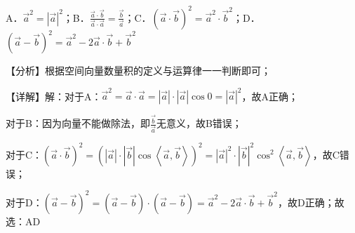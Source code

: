 



\bindopt A．\({\overrightarrow{a}}^{2} = \allowbreak\left| \overrightarrow{a} \right|^{2}\)；B．\(\frac{\overrightarrow{a} \cdot \overrightarrow{b}}{\overrightarrow{a} \cdot \overrightarrow{a}} = \frac{\overrightarrow{b}}{\overrightarrow{a}}\)；C．\(\left( \overrightarrow{a} \cdot \overrightarrow{b} \right)^{2} = {\overrightarrow{a}}^{2} \cdot {\overrightarrow{b}}^{2}\)；D．\(\left( \overrightarrow{a} - \overrightarrow{b} \right)^{2} = {\overrightarrow{a}}^{2} - 2\overrightarrow{a} \cdot \overrightarrow{b} + {\overrightarrow{b}}^{2}\)

\bindp 【分析】根据空间向量数量积的定义与运算律一一判断即可；

\bindp 【详解】解：对于A：\({\overrightarrow{a}}^{2} = \overrightarrow{a} \cdot \overrightarrow{a} = \allowbreak\left| \overrightarrow{a} \right| \cdot \allowbreak\left| \overrightarrow{a} \right|\cos 0 = \allowbreak\left| \overrightarrow{a} \right|^{2}\)，故A正确；

\bindp 对于B：因为向量不能做除法，即\(\frac{\overrightarrow{b}}{\overrightarrow{a}}\)无意义，故B错误；

\bindp 对于C：\(\left( \overrightarrow{a} \cdot \overrightarrow{b} \right)^{2} = \allowbreak\left( \left| \overrightarrow{a} \right| \cdot \allowbreak\left| \overrightarrow{b} \right|\cos\left\langle \overrightarrow{a},\overrightarrow{b} \right\rangle \right)^{2} = \allowbreak\left| \overrightarrow{a} \right|^{2} \cdot \allowbreak\left| \overrightarrow{b} \right|^{2}\cos^{2}\left\langle \overrightarrow{a},\overrightarrow{b} \right\rangle\)，故C错误；

\bindp 对于D：\(\left( \overrightarrow{a} - \overrightarrow{b} \right)^{2} = \allowbreak\left( \overrightarrow{a} - \overrightarrow{b} \right) \cdot \allowbreak\left( \overrightarrow{a} - \overrightarrow{b} \right) = {\overrightarrow{a}}^{2} - 2\overrightarrow{a} \cdot \overrightarrow{b} + {\overrightarrow{b}}^{2}\)，故D正确；故选：AD


